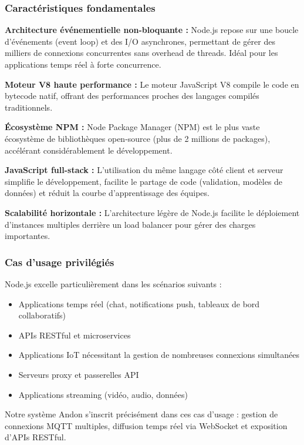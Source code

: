 \subsubsection{Caractéristiques fondamentales}

\textbf{Architecture événementielle non-bloquante :} Node.js repose sur une boucle d'événements (event loop) et des I/O asynchrones, permettant de gérer des milliers de connexions concurrentes sans overhead de threads. Idéal pour les applications temps réel à forte concurrence.

\textbf{Moteur V8 haute performance :} Le moteur JavaScript V8 compile le code en bytecode natif, offrant des performances proches des langages compilés traditionnels.

\textbf{Écosystème NPM :} Node Package Manager (NPM) est le plus vaste écosystème de bibliothèques open-source (plus de 2 millions de packages), accélérant considérablement le développement.


\textbf{JavaScript full-stack :} L'utilisation du même langage côté client et serveur simplifie le développement, facilite le partage de code (validation, modèles de données) et réduit la courbe d'apprentissage des équipes.

\textbf{Scalabilité horizontale :} L'architecture légère de Node.js facilite le déploiement d'instances multiples derrière un load balancer pour gérer des charges importantes.

\subsubsection{Cas d'usage privilégiés}

Node.js excelle particulièrement dans les scénarios suivants :

\begin{itemize}
    \item Applications temps réel (chat, notifications push, tableaux de bord collaboratifs)
    \item APIs RESTful et microservices
    \item Applications IoT nécessitant la gestion de nombreuses connexions simultanées
    \item Serveurs proxy et passerelles API
    \item Applications streaming (vidéo, audio, données)
\end{itemize}

Notre système Andon s'inscrit précisément dans ces cas d'usage : gestion de connexions MQTT multiples, diffusion temps réel via WebSocket et exposition d'APIs RESTful.

